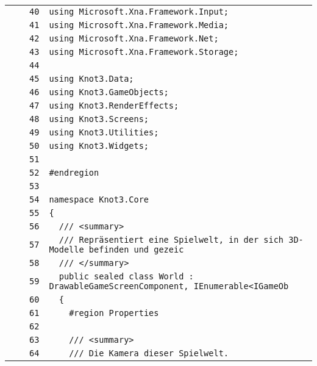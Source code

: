 \documentclass[a4paper,10pt]{article}
\begin{document}
\begin{longtable}[l]{lrrl}
\cellcolor{gray} &  & \verb~40~ & \verb~using Microsoft.Xna.Framework.Input;~\\
\cellcolor{gray} &  & \verb~41~ & \verb~using Microsoft.Xna.Framework.Media;~\\
\cellcolor{gray} &  & \verb~42~ & \verb~using Microsoft.Xna.Framework.Net;~\\
\cellcolor{gray} &  & \verb~43~ & \verb~using Microsoft.Xna.Framework.Storage;~\\
\cellcolor{gray} &  & \verb~44~ & \verb~~\\
\cellcolor{gray} &  & \verb~45~ & \verb~using Knot3.Data;~\\
\cellcolor{gray} &  & \verb~46~ & \verb~using Knot3.GameObjects;~\\
\cellcolor{gray} &  & \verb~47~ & \verb~using Knot3.RenderEffects;~\\
\cellcolor{gray} &  & \verb~48~ & \verb~using Knot3.Screens;~\\
\cellcolor{gray} &  & \verb~49~ & \verb~using Knot3.Utilities;~\\
\cellcolor{gray} &  & \verb~50~ & \verb~using Knot3.Widgets;~\\
\cellcolor{gray} &  & \verb~51~ & \verb~~\\
\cellcolor{gray} &  & \verb~52~ & \verb~#endregion~\\
\cellcolor{gray} &  & \verb~53~ & \verb~~\\
\cellcolor{gray} &  & \verb~54~ & \verb~namespace Knot3.Core~\\
\cellcolor{gray} &  & \verb~55~ & \verb~{~\\
\cellcolor{gray} &  & \verb~56~ & \verb~  /// <summary>~\\
\cellcolor{gray} &  & \verb~57~ & \verb~  /// Repräsentiert eine Spielwelt, in der sich 3D-Modelle befinden und gezeic~\\
\cellcolor{gray} &  & \verb~58~ & \verb~  /// </summary>~\\
\cellcolor{gray} &  & \verb~59~ & \verb~  public sealed class World : DrawableGameScreenComponent, IEnumerable<IGameOb~\\
\cellcolor{gray} &  & \verb~60~ & \verb~  {~\\
\cellcolor{gray} &  & \verb~61~ & \verb~    #region Properties~\\
\cellcolor{gray} &  & \verb~62~ & \verb~~\\
\cellcolor{gray} &  & \verb~63~ & \verb~    /// <summary>~\\
\cellcolor{gray} &  & \verb~64~ & \verb~    /// Die Kamera dieser Spielwelt.~\\

\end{longtable}
\end{document}
